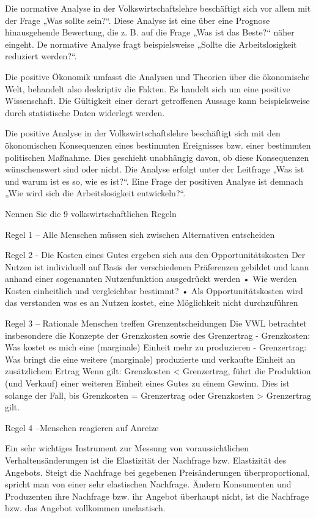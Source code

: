 Die normative Analyse in der Volkswirtschaftslehre beschäftigt sich
vor allem mit der Frage „Was sollte sein?“. Diese Analyse ist eine
über eine Prognose hinausgehende Bewertung, die z. B. auf die
Frage „Was ist das Beste?“ näher eingeht.
De normative Analyse fragt beispielsweise
„Sollte die Arbeitslosigkeit reduziert werden?“.

Die positive Ökonomik umfasst die Analysen und Theorien über die
ökonomische Welt, behandelt also deskriptiv die Fakten. Es handelt
sich um eine positive Wissenschaft. Die Gültigkeit einer derart
getroffenen Aussage kann beispielsweise durch statistische Daten
widerlegt werden.

Die positive Analyse in der Volkswirtschaftslehre beschäftigt sich
mit den ökonomischen Konsequenzen eines bestimmten Ereignisses
bzw. einer bestimmten politischen Maßnahme. Dies geschieht
unabhängig davon, ob diese Konsequenzen wünschenswert sind
oder nicht. Die Analyse erfolgt unter der Leitfrage „Was ist und
warum ist es so, wie es ist?“. Eine Frage der positiven Analyse ist
demnach „Wie wird sich die Arbeitslosigkeit entwickeln?“.



Nennen Sie die 9 volkswirtschaftlichen Regeln

Regel 1 – Alle Menschen müssen sich zwischen Alternativen entscheiden

Regel 2 - Die Kosten eines Gutes ergeben sich aus den Opportunitätskosten
Der Nutzen ist individuell auf Basis der verschiedenen Präferenzen gebildet und kann anhand einer sogenannten Nutzenfunktion ausgedrückt werden
• Wie werden Kosten einheitlich und vergleichbar bestimmt?
• Als Opportunitätskosten wird das verstanden was es an Nutzen kostet, eine Möglichkeit nicht durchzuführen


Regel 3 – Rationale Menschen treffen Grenzentscheidungen
Die VWL betrachtet insbesondere die Konzepte der Grenzkosten sowie des Grenzertrag
- Grenzkosten: Was kostet es mich eine (marginale) Einheit mehr zu produzieren
- Grenzertrag: Was bringt die eine weitere (marginale) produzierte und verkaufte Einheit an zusätzlichem Ertrag
Wenn gilt: Grenzkosten < Grenzertrag, führt die Produktion (und Verkauf) einer weiteren Einheit eines Gutes zu einem Gewinn. 
Dies ist solange der Fall, bis Grenzkosten = Grenzertrag oder Grenzkosten > Grenzertrag gilt.

Regel 4 –Menschen reagieren auf Anreize

Ein sehr wichtiges Instrument zur Messung von voraussichtlichen Verhaltensänderungen ist 
die Elastizität der Nachfrage bzw. Elastizität des Angebots.
Steigt die Nachfrage bei gegebenen Preisänderungen überproportional, spricht man von einer sehr elastischen Nachfrage.
Ändern Konsumenten und Produzenten ihre Nachfrage bzw. ihr Angebot überhaupt nicht, ist die Nachfrage bzw. das Angebot vollkommen unelastisch.

